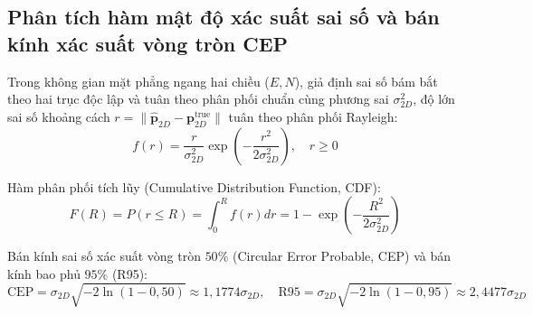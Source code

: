 \subsection{Phân tích hàm mật độ xác suất sai số và bán kính xác suất vòng tròn CEP}

\hspace{0.5cm} Trong không gian mặt phẳng ngang hai chiều ($E, N$), giả định sai số bám bắt theo hai trục độc lập và tuân theo phân phối chuẩn cùng phương sai $\sigma_{2D}^2$, độ lớn sai số khoảng cách $r = \|\hat{\mathbf{p}}_{2D} - \mathbf{p}_{2D}^{\text{true}}\|$ tuân theo phân phối Rayleigh:
\begin{equation}
f(r) = \frac{r}{\sigma_{2D}^2} \exp\left(-\frac{r^2}{2\sigma_{2D}^2}\right), \quad r \ge 0
\label{eq:rayleigh-pdf-formula}
\end{equation}

Hàm phân phối tích lũy (Cumulative Distribution Function, CDF):
\begin{equation}
F(R) = P(r \le R) = \int_0^R f(r) dr = 1 - \exp\left(-\frac{R^2}{2\sigma_{2D}^2}\right)
\label{eq:rayleigh-cdf-formula}
\end{equation}

Bán kính sai số xác suất vòng tròn $50\%$ (Circular Error Probable, CEP) và bán kính bao phủ $95\%$ (R95):
\begin{equation}
\text{CEP} = \sigma_{2D} \sqrt{-2 \ln(1 - 0{,}50)} \approx 1{,}1774 \sigma_{2D}, \quad \text{R95} = \sigma_{2D} \sqrt{-2 \ln(1 - 0{,}95)} \approx 2{,}4477 \sigma_{2D}
\label{eq:cep-and-r95-formulas}
\end{equation}

\begin{table}[H]
\centering
\caption{Các chỉ số thống kê sai số không gian 2D theo phân phối Rayleigh trên 3 loại mục tiêu}
\label{tab:rayleigh-cep-metrics-table}
\end{table}

